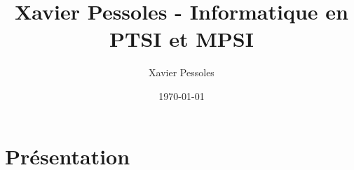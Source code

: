 \documentclass[
	fontsize=10pt, %
	twoside=true, %
]{kaobook}
\newcommand{\repRel}{../../../..}
\newcommand{\repStyle}{\repRel/Style}
\begin{document}

\titlehead{Xavier Pessoles - Informatique en PTSI et MPSI}
\title[Xavier Pessoles - Informatique en PTSI et MPSI]{Xavier Pessoles - Informatique en PTSI et MPSI}
\author[XP]{Xavier Pessoles}
\date{\today}


\begingroup %
\endgroup

%
\mainmatter %
%
%
%
%


\setcounter{margintocdepth}{\sectiontocdepth}
\marginlayout
\graphicspath{{\repStyle/png}}

\pagestyle{xp.scrheadings}


%



\newcommand{\repExo}{}
\newcommand{\nomExo}{}

\livrettrue %
\collefalse


\setcounter{chapter}{0}

\newcommand{\repCours}{\repRel/Informatique/Cours/00_PriseEnMain/Cours}
\graphicspath{{\repStyle/png}{\repCours/images/}}
\setchapterpreamble[u]{\margintoc}
\chapter{Présentation}

%
%
%
%
%
%
%
\end{document}
